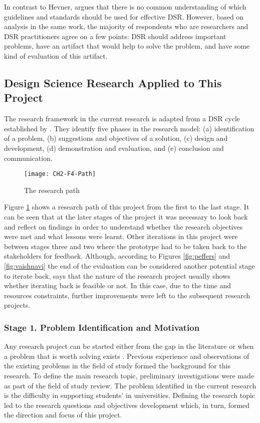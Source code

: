 In contrast to Hevner, \citet{Venable2010} argues that there is no common
understanding of which guidelines and standards should be used for effective
DSR. However, based on analysis in the same work, the majority of respondents
who are researchers and DSR practitioners agree on a few points: DSR should
address important problems, have an artifact that would help to solve the
problem, and have some kind of evaluation of this artifact.

\subsection{Design Science Research Applied to This Project}

The research framework in the current research is adapted from a DSR cycle
established by \citet{Vaishnavi2007}. They identify five phases in the research
model: (a) identification of a problem, (b) suggestions and objectives of a
solution, (c) design and development, (d) demonstration and evaluation, and (e)
conclusion and communication.

\begin{figure}[htb]
\centering
\texttt{[image: CH2-F4-Path]}
\caption{The research path}
\label{fig:path}
\end{figure}

Figure \ref{fig:path} shows a research path of this project from the first
to the last stage. It can be seen that at the later stages of the project it was
necessary to look back and reflect on findings in order to understand whether
the research objectives were met and what lessons were learnt. Other iterations
in this project were between stages three and two where the prototype had to be
taken back to the stakeholders for feedback. Although, according to Figures
\ref{fig:peffers} and \ref{fig:vaishnavi} the end of the evaluation can be
considered another potential stage to iterate back, \citet{Peffers2008} says
that the nature of the research project usually shows whether iterating back is
feasible or not. In this case, due to the time and resources constraints,
further improvements were left to the subsequent research projects.

\subsubsection{Stage 1. Problem Identification and Motivation}

Any research project can be started either from the gap in the literature or
when a problem that is worth solving exists \citep{Bourner2002}. Previous
experience and observations of the existing problems in the field of study
formed the background for this research. To define the main research topic,
preliminary investigations were made as part of the field of study review. The
problem identified in the current research is the difficulty in supporting
students' \LLLs in universities. Defining the research topic led to the research
questions and objectives development which, in turn, formed the direction and
focus of this project.


